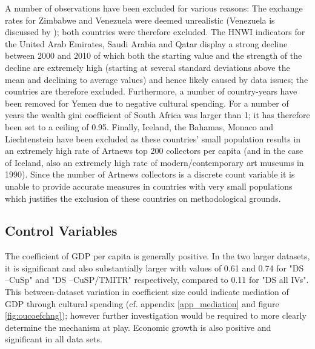 \documentclass[11pt, authoryear]{elsarticle}
\begin{document}
A number of observations have been excluded for various reasons:
The exchange rates for Zimbabwe and Venezuela were deemed unrealistic (Venezuela is discussed by \citet{Blanchet_2017_conversions}); both countries were therefore excluded.
The HNWI indicators for the United Arab Emirates, Saudi Arabia and Qatar display a strong decline between 2000 and 2010 of which both the starting value and the strength of the decline are extremely high (starting at several standard deviations above the mean and declining to average values) and hence likely caused by data issues; the countries are therefore excluded. 
Furthermore, a number of country-years have been removed for Yemen due to negative cultural spending.
For a number of years the wealth gini coefficient of South Africa was larger than 1; it has therefore been set to a ceiling of 0.95.
Finally, Iceland, the Bahamas, Monaco and Liechtenstein have been excluded as these countries' small population results in an extremely high rate of Artnews top 200 collectors per capita (and in the case of Iceland, also an extremely high rate of modern/contemporary art museums in 1990).
Since the number of Artnews collectors is a discrete count variable it is unable to provide accurate measures in countries with very small populations which justifies the exclusion of these countries on methodological grounds.







\subsection{Control Variables}
\label{app_controls}



The coefficient of GDP per capita is generally positive. 
In the two larger datasets, it is significant and also substantially larger with values of 0.61 and 0.74 for "DS --CuSp" and "DS --CuSP/TMITR" respectively, compared to 0.11 for "DS all IVs".
This between-dataset variation in coefficient size could indicate mediation of GDP through cultural spending (cf. appendix \ref{app_mediation} and figure \ref{fig:oucoefchng}); however further investigation would be required to more clearly determine the mechanism at play. 
Economic growth is also positive and significant in all data sets.
\end{document}
